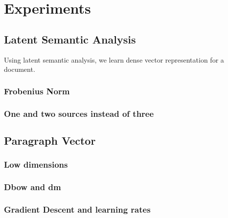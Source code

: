 \chapter{Experiments}
\section{Latent Semantic Analysis}
Using latent semantic analysis, we learn dense vector representation for a document.
\subsection{Frobenius Norm}
\subsection{One and two sources instead of three}

\section{Paragraph Vector}
\subsection{Low dimensions}
\subsection{Dbow and dm}
\subsection{Gradient Descent and learning rates}

